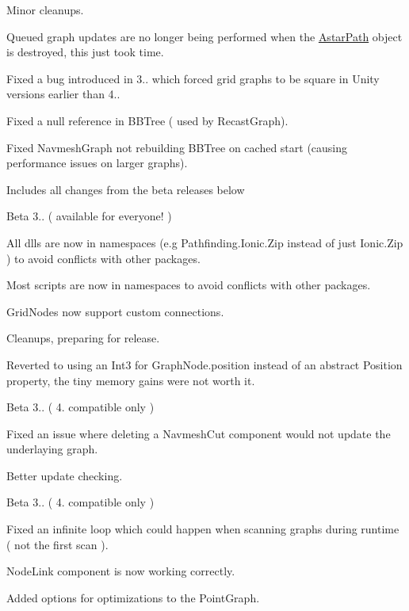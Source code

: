 \begin{DoxyItemize}
\begin{DoxyItemize}
\item Minor cleanups.
\item Queued graph updates are no longer being performed when the \mbox{\hyperlink{class_astar_path}{Astar\+Path}} object is destroyed, this just took time.
\item Fixed a bug introduced in 3.. which forced grid graphs to be square in Unity versions earlier than 4..
\item Fixed a null reference in B\+B\+Tree ( used by Recast\+Graph).
\item Fixed Navmesh\+Graph not rebuilding B\+B\+Tree on cached start (causing performance issues on larger graphs).
\item Includes all changes from the beta releases below
\end{DoxyItemize}
\item Beta 3.. ( available for everyone! )
\begin{DoxyItemize}
\item All dlls are now in namespaces (e.\+g Pathfinding.\+Ionic.\+Zip instead of just Ionic.\+Zip ) to avoid conflicts with other packages.
\item Most scripts are now in namespaces to avoid conflicts with other packages.
\item Grid\+Nodes now support custom connections.
\item Cleanups, preparing for release.
\item Reverted to using an Int3 for Graph\+Node.\+position instead of an abstract Position property, the tiny memory gains were not worth it.
\end{DoxyItemize}
\item Beta 3.. ( 4. compatible only )
\begin{DoxyItemize}
\item Fixed an issue where deleting a Navmesh\+Cut component would not update the underlaying graph.
\item Better update checking.
\end{DoxyItemize}
\item Beta 3.. ( 4. compatible only )
\begin{DoxyItemize}
\item Fixed an infinite loop which could happen when scanning graphs during runtime ( not the first scan ).
\item Node\+Link component is now working correctly.
\item Added options for optimizations to the Point\+Graph.

\end{DoxyItemize}
\end{DoxyItemize}
